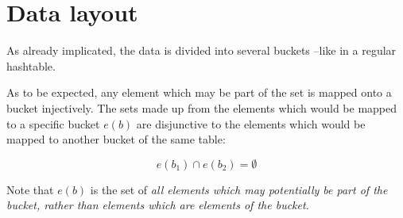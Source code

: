 \section{Data layout}

    As already implicated, the data is divided into several buckets --like in a
    regular hashtable. 

    As to be expected, any element which may be part of the set is mapped onto
    a bucket injectively.
    The sets made up from the elements which would be mapped to a specific
    bucket $e(b)$ are disjunctive to the elements which would be mapped to
    another bucket of the same table:

    \begin{equation}
        e(b_1) \cap e(b_2) = \emptyset
    \end{equation}

    Note that $e(b)$ is the set of \em all\em{} elements which \em may\em{}
    potentially be part of the bucket, rather than elements which \em are\em{}
    elements of the bucket.

